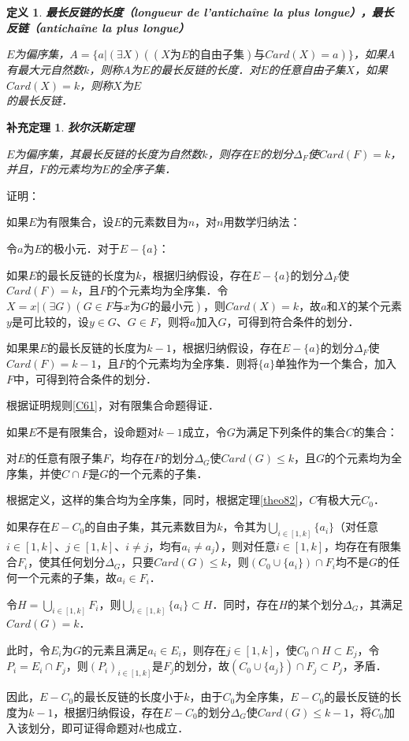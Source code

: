 \documentclass[12pt, a4paper, oneside]{book}
\newtheorem{cor}{补充定理}
\newtheorem{de}{定义}
\begin{document}
			\begin{de}
				\textbf{最长反链的长度（longueur de l'antichaîne la plus longue），最长反链（antichaîne la plus longue）}
				\par
				$E$为偏序集，$A=\{a|(\exists X)((X\text{为}E\text{的自由子集})\text{与}Card(X)=a)\}$，如果$A$有最大元自然数$k$，则称$A$为$E$的最长反链的长度．对$E$的任意自由子集$X$，如果$Card(X)=k$，则称$X$为$E$\\的最长反链．
			\end{de}
				
			\begin{cor}\label{cor306}
				\textbf{狄尔沃斯定理}
				\par
				$E$为偏序集，其最长反链的长度为自然数$k$，则存在$E$的划分$\Delta_F$使$Card(F)=k$，并且，$F$的元素均为$E$的全序子集．
			\end{cor}
			证明：
			\par
			如果$E$为有限集合，设$E$的元素数目为$n$，对$n$用数学归纳法：
			\par
			令$a$为$E$的极小元．对于$E-\{a\}$：
			\par
			如果$E$的最长反链的长度为$k$，根据归纳假设，存在$E-\{a\}$的划分$\Delta_F$使$Card(F)=k$，且$F$的个元素均为全序集．令$X={x|(\exists G)(G\in F\text{与}x\text{为}G\text{的最小元})}$，则$Card(X)=k$，故$a$和$X$的某个元素$y$是可比较的，设$y\in G$、$G\in F$，则将$a$加入$G$，可得到符合条件的划分．
			\par
			如果果$E$的最长反链的长度为$k-1$，根据归纳假设，存在$E-\{a\}$的划分$\Delta_F$使$Card(F)=k-1$，且$F$的个元素均为全序集．则将$\{a\}$单独作为一个集合，加入$F$中，可得到符合条件的划分．
			\par
			根据证明规则\ref{C61}，对有限集合命题得证．
			\par
			如果$E$不是有限集合，设命题对$k-1$成立，令$G$为满足下列条件的集合$C$的集合：
			\par
			对$E$的任意有限子集$F$，均存在$F$的划分$\Delta_G$使$Card(G)\leq k$，且$G$的个元素均为全序集，并使$C\cap F$是$G$的一个元素的子集．
			\par
			根据定义，这样的集合均为全序集，同时，根据定理\ref{theo82}，$C$有极大元$C_0$．
			\par
			如果存在$E-C_0$的自由子集，其元素数目为$k$，令其为$\bigcup\limits_{i\in [1, k]}\{a_i\}$（对任意$i\in [1, k]$、$j\in [1, k]$、$i \neq j$，均有$a_i\neq a_j$），则对任意$i\in [1, k]$，均存在有限集合$F_i$，使其任何划分$\Delta_G$，只要$Card(G)\leq k$，则$(C_0\cup\{a_i\})\cap F_i$均不是$G$的任何一个元素的子集，故$a_i\in F_i$．
			\par
			令$H=\bigcup\limits_{i\in [1, k]}F_i$，则$\bigcup\limits_{i\in [1, k]}\{a_i\}\subset H$．同时，存在$H$的某个划分$\Delta_G$，其满足$Card(G)=k$．
			\par
			此时，令$E_i$为$G$的元素且满足$a_i\in E_i$，则存在$j\in [1, k]$，使$C_0\cap H\subset E_j$，令$P_i=E_i\cap F_j$，则$(P_i)_{i\in [1, k]}$是$F_j$的划分，故$(C_0\cup\{a_j\})\cap F_j\subset P_j$，矛盾．
			\par
			因此，$E-C_0$的最长反链的长度小于$k$，由于$C_0$为全序集，$E-C_0$的最长反链的长度为$k-1$，根据归纳假设，存在$E-C_0$的划分$\Delta_G$使$Card(G)\leq k-1$，将$C_0$加入该划分，即可证得命题对$k$也成立．
			
\end{document}
